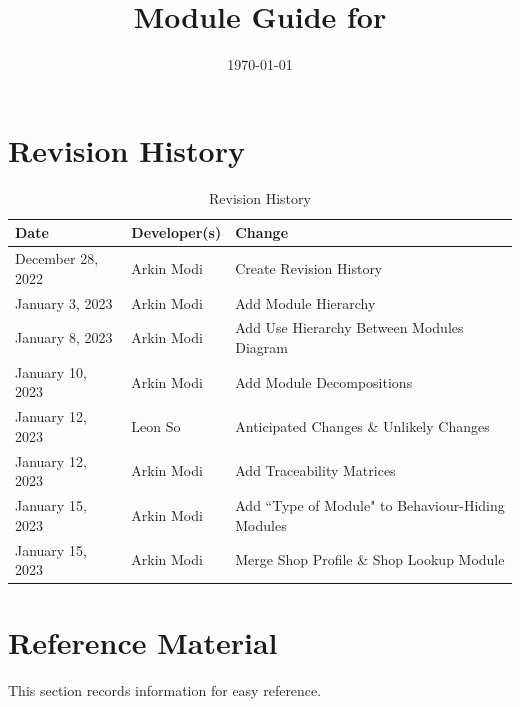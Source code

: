 \documentclass[12pt, titlepage]{article}
\begin{document}
\title{Module Guide for \progname{}}
\author{\authname}
\date{\today}

\maketitle


\section{Revision History}

\begin{table}[hp]
	\caption{Revision History} \label{TblRevisionHistory}
	\begin{tabularx}{\textwidth}{llX}
		\toprule
		\textbf{Date}     & \textbf{Developer(s)} & \textbf{Change}                                   \\
		\midrule
		December 28, 2022 & Arkin Modi            & Create Revision History                           \\
		January 3, 2023   & Arkin Modi            & Add Module Hierarchy                              \\
		January 8, 2023   & Arkin Modi            & Add Use Hierarchy Between Modules Diagram         \\
		January 10, 2023  & Arkin Modi            & Add Module Decompositions                         \\
		January 12, 2023  & Leon So               & Anticipated Changes \& Unlikely Changes           \\
		January 12, 2023  & Arkin Modi            & Add Traceability Matrices                         \\
		January 15, 2023  & Arkin Modi            & Add ``Type of Module" to Behaviour-Hiding Modules \\
		January 15, 2023  & Arkin Modi            & Merge Shop Profile \& Shop Lookup Module          \\
		\bottomrule
	\end{tabularx}
\end{table}

\newpage

\section{Reference Material}

This section records information for easy reference.
\end{document}
